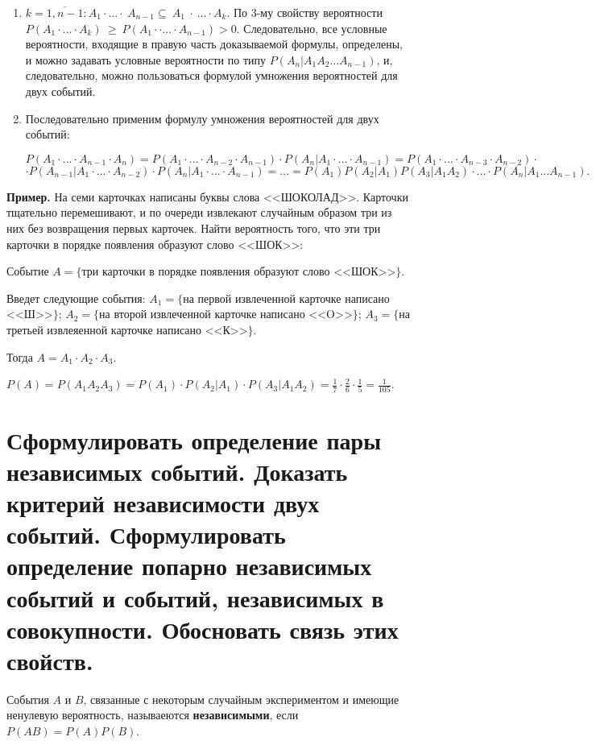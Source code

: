 \begin{enumerate}
	\item $k = \overline{1, n - 1}: A_1\cdot...\cdot~A_{n-1}\subseteq~A_1~\cdot~...\cdot A_k$. По 3-му свойству вероятности $P(A_1\cdot...\cdot A_k)~\geq~P(A_1\cdot \cdot ...\cdot A_{n-1})>0$. Следовательно, все условные вероятности, входящие в правую часть доказываемой формулы, определены, и можно задавать условные вероятности по типу $P(A_n|A_1A_2...A_{n-1})$, и, следовательно, можно пользоваться формулой умножения вероятностей для двух событий.
	
	\item Последовательно применим формулу умножения вероятностей для двух событий: 
	
	$P(A_1 \cdot ... \cdot A_{n-1} \cdot A_n) = P(A_1 \cdot ... \cdot A_{n-2} \cdot A_{n-1}) \cdot P(A_n | A_1 \cdot ... \cdot A_{n-1}) = P(A_1 \cdot ... \cdot A_{n-3} \cdot A_{n-2}) \cdot$  $\cdot P(A_{n-1} | A_1 \cdot ... \cdot A_{n-2}) \cdot P(A_n | A_1 \cdot ... \cdot A_{n-1}) = ... = P(A_1)P(A_2|A_1)P(A_3|A_1A_2) \cdot ... \cdot P(A_n|A_1 ... A_{n-1}).$
\end{enumerate}

\textbf{Пример.} На семи карточках написаны буквы слова <<ШОКОЛАД>>. Карточки тщательно перемешивают, и по очереди извлекают случайным образом три из них без возвращения первых карточек. Найти вероятность того, что эти три карточки в порядке появления образуют слово <<ШОК>>:

Событие $A = \{$три карточки в порядке появления образуют слово <<ШОК>>$\}$.

Введет следующие события: 
$A_1 = \{$на первой извлеченной карточке написано <<Ш>>$\}$;
$A_2 = \{$на второй извлеченной карточке написано <<O>>$\}$;
$A_3 = \{$на третьей извлеяенной карточке написано <<К>>$\}$.

Тогда $A = A_1 \cdot A_2 \cdot A_3$.

$P(A) = P(A_1A_2A_3) = P(A_1) \cdot P(A_2|A_1) \cdot P(A_3|A_1A_2) = \frac{1}{7} \cdot \frac{2}{6} \cdot \frac{1}{5} = \frac{1}{105}$.

\section{Сформулировать определение пары независимых событий. Доказать критерий независимости двух событий. Сформулировать определение попарно независимых событий и событий, независимых в совокупности. Обосновать связь этих свойств.}

События $A$ и $B$, связанные с некоторым случайным экспериментом и имеющие ненулевую вероятность, называеются \textbf{независимыми}, если $P(AB) = P(A)P(B)$.

